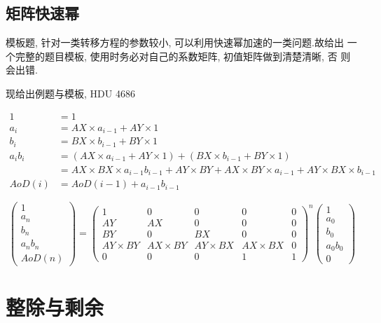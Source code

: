     \subsection{矩阵快速幂}\small
模板题, 针对一类转移方程的参数较小, 可以利用快速幂加速的一类问题.故给出
一个完整的题目模板, 使用时务必对自己的系数矩阵, 初值矩阵做到清楚清晰, 否
则会出错.

现给出例题与模板, HDU 4686

$
\begin{aligned}
 1 &= 1\\
 {a_i} &= AX \times {a_{i - 1}} + AY \times 1\\
 {b_i} &= BX \times {b_{i - 1}} + BY \times 1\\
 {a_i}{b_i} &= (AX \times {a_{i - 1}} + AY \times 1) + (BX \times {b_{i - 1}} + BY \times 1)\\
 &= AX \times BX \times {a_{i - 1}}{b_{i - 1}} + AY \times BY + AX \times BY \times {a_{i - 1}} + AY \times BX \times {b_{i - 1}}\\
 AoD(i) &= AoD(i - 1) + {a_{i - 1}}{b_{i - 1}}
\end{aligned}
$

\[\left( {\begin{array}{*{20}{c}}
1\\
{{a_n}}\\
{{b_n}}\\
{{a_n}{b_n}}\\
{AoD(n)}
\end{array}} \right) = {\left( {\begin{array}{*{20}{c}}
1&0&0&0&0\\
{AY}&{AX}&0&0&0\\
{BY}&0&{BX}&0&0\\
{AY \times BY}&{AX \times BY}&{AY \times BX}&{AX \times BX}&0\\
0&0&0&1&1
\end{array}} \right)^n}\left( {\begin{array}{*{20}{c}}
1\\
{{a_0}}\\
{{b_0}}\\
{{a_0}{b_0}}\\
0
\end{array}} \right)\]




\section{整除与剩余}


